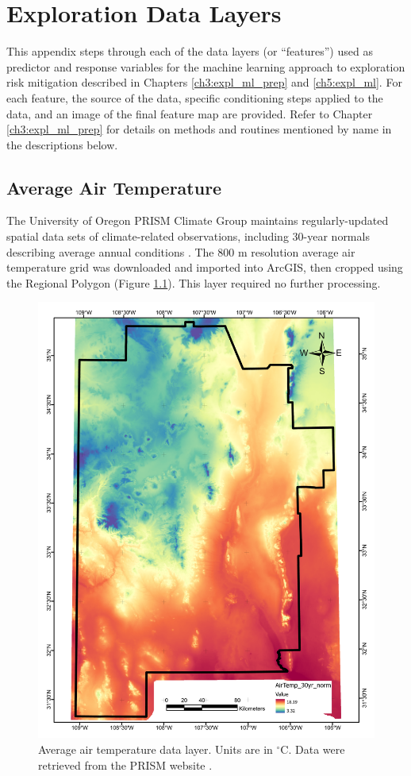 \chapter{Exploration Data Layers}\label{app:A_data_layers}

This appendix steps through each of the data layers (or ``features'') used as predictor and response variables for the machine learning approach to exploration risk mitigation described in Chapters \ref{ch3:expl_ml_prep} and \ref{ch5:expl_ml}. For each feature, the source of the data, specific conditioning steps applied to the data, and an image of the final feature map are provided. Refer to Chapter \ref{ch3:expl_ml_prep} for details on methods and routines mentioned by name in the descriptions below.
\vfill
\pagebreak

\section{Average Air Temperature}\label{app:dl_air_temp}
The University of Oregon PRISM Climate Group maintains regularly-updated spatial data sets of climate-related observations, including 30-year normals describing average annual conditions \citep{daly_physiographically_2008, prism_prism_2021}. The 800 m resolution average air temperature grid was downloaded and imported into ArcGIS, then cropped using the Regional Polygon (Figure \ref{fig:feat_airtemp}). This layer required no further processing.

\begin{figure}[H]
\centering
\includegraphics[width=0.75\linewidth]{templates/images/Figure-AvgAirTemp.pdf}
\caption[Average air temperature data layer]{Average air temperature data layer. Units are in $^\circ$C. Data were retrieved from the PRISM website \protect\citep{prism_prism_2021}.}
\label{fig:feat_airtemp}
\end{figure}
\pagebreak

